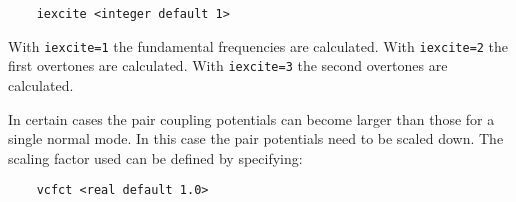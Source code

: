 \begin{verbatim}
    iexcite <integer default 1>
\end{verbatim}

With \verb+iexcite=1+ the fundamental frequencies are calculated.
With \verb+iexcite=2+ the first overtones are calculated.
With \verb+iexcite=3+ the second overtones are calculated.

In certain cases the pair coupling potentials can become larger than those for a single 
normal mode. In this case the pair potentials need to be scaled down. The scaling factor 
used can be defined by specifying:

\begin{verbatim}
    vcfct <real default 1.0>
\end{verbatim}


